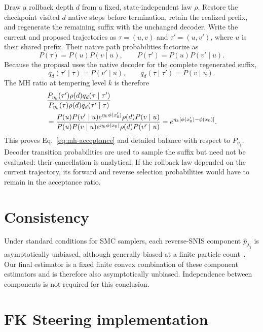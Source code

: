 \documentclass{article}
\begin{document}
Draw a rollback depth $d$ from a fixed, state-independent law $\rho$. Restore
the checkpoint visited $d$ native steps before termination, retain the realized
prefix, and regenerate the remaining suffix with the unchanged decoder. Write
the current and proposed trajectories as $\tau=(u,v)$ and $\tau'=(u,v')$,
where $u$ is their shared prefix. Their native path probabilities factorize as
\begin{equation}
P(\tau)=P(u)P(v\mid u),
\qquad
P(\tau')=P(u)P(v'\mid u).
\end{equation}
Because the proposal uses the native decoder for the complete regenerated
suffix,
\begin{equation}
q_d(\tau'\mid\tau)=P(v'\mid u),
\qquad
q_d(\tau\mid\tau')=P(v\mid u).
\end{equation}
The MH ratio at tempering level $k$ is therefore
\begin{align}
&\frac{P_{\eta_k}(\tau')\rho(d)q_d(\tau\mid\tau')}
{P_{\eta_k}(\tau)\rho(d)q_d(\tau'\mid\tau)} \notag\\
&=\frac{P(u)P(v'\mid u)e^{\eta_k\phi(x'_0)}\rho(d)P(v\mid u)}
{P(u)P(v\mid u)e^{\eta_k\phi(x_0)}\rho(d)P(v'\mid u)}
=e^{\eta_k[\phi(x'_0)-\phi(x_0)]}.
\end{align}
This proves Eq.~\eqref{eq:mh-acceptance} and detailed balance with respect to
$P_{\eta_k}$. Decoder transition probabilities are used to sample the suffix
but need not be evaluated: their cancellation is analytical. If the rollback
law depended on the current trajectory, its forward and reverse selection
probabilities would have to remain in the acceptance ratio.

\section{Consistency}
\label{app:consistency}

Under standard conditions for SMC samplers, each reverse-SNIS component
$\widehat p_{\lambda_j}$ is asymptotically unbiased, although generally biased
at a finite particle count~\citep{chopin2004clt,delmoral2006smcsamplers}. Our
final estimator is a fixed finite convex combination of these component
estimators and is therefore also asymptotically unbiased. Independence between
components is not required for this conclusion.

\section{FK Steering implementation}
\label{app:fk}
\end{document}
